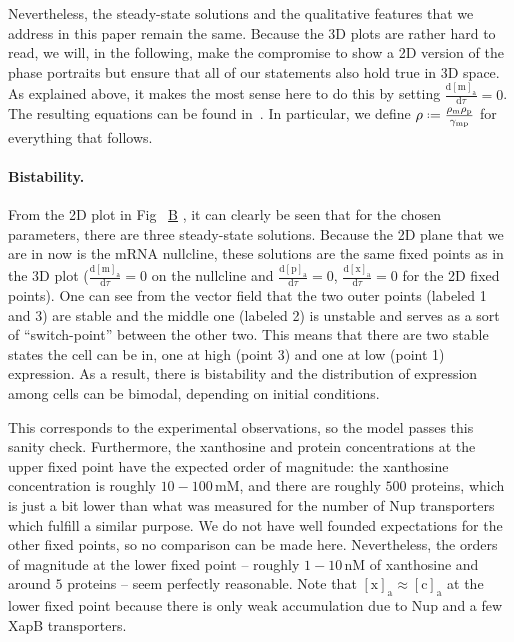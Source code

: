 \documentclass[10pt,letterpaper]{article}
\newcommand{\unit}[1]{\,\mathrm{#1}}
\newcommand{\n}[1]{\mathrm{#1}}
\newcommand{\dd}[2]{\frac{\mathrm{d} #1}{\mathrm{d} #2}}
\newcommand*{\defeq}{\mathrel{\vcenter{\baselineskip0.5ex \lineskiplimit0pt
			\hbox{\scriptsize.}\hbox{\scriptsize.}}}%
	=}
\newcommand\subref[2]{%
	\def\myref{\getrefnumber{#1}}%
	\hyperref[#1]{\myref\mbox{#2}}%
}
\begin{document}
Nevertheless, the steady-state solutions and the qualitative features that
we address in this paper remain the same. Because the 3D plots are rather
hard to read, we will, in the following, make the compromise to show a 2D
version of the phase portraits but ensure that all of our statements also
hold true in 3D space. As explained above, it makes the most sense here to
do this by setting $\dd{\n{[m]_a}}{\tau}=0$. The resulting equations can be
found in~. In particular, we define $\rho \defeq
\frac{\rho_{\n{m}} \rho_{\n{p}}}{\gamma_{\n{mp}}}$ for everything that
follows.

\paragraph*{Bistability.} 
From the 2D plot in Fig~\subref{fig4:bistability}{B}, it can clearly be seen
that for the chosen parameters, there are three steady-state solutions.
Because the 2D plane that we are in now is the mRNA nullcline, these
solutions are the same fixed points as in the 3D plot
($\dd{\n{[m]_a}}{\tau}=0$ on the nullcline and $\dd{\n{[p]_a}}{\tau}=0$,
$\dd{\n{[x]_a}}{\tau}=0$ for the 2D fixed points). One can see from the
vector field that the two outer points (labeled 1 and 3) are stable and the
middle one (labeled 2) is unstable and serves as a sort of ``switch-point''
between the other two. This means that there are two stable states the cell
can be in, one at high (point 3) and one at low (point 1) expression. As a
result, there is bistability and the distribution of expression among cells
can be bimodal, depending on initial conditions.

This corresponds to the experimental observations\cite{Chure2019}, so the model passes this
sanity check. Furthermore, the xanthosine and protein concentrations at the
upper fixed point have the expected order of magnitude: the xanthosine
concentration is roughly $10-100 \unit{mM}$, and there are roughly $500$
proteins, which is just a bit lower than what was measured for the number of
Nup transporters~\cite{Li2014} which fulfill a similar purpose. We do not
have well founded expectations for the other fixed points, so no comparison
can be made here. Nevertheless, the orders of magnitude at the lower fixed
point -- roughly $1-10 \unit{nM}$ of xanthosine and around $5$ proteins --
seem perfectly reasonable. Note that $\n{[x]_a} \approx \n{[c]_a}$ at the
lower fixed point because there is only weak accumulation due to Nup and a
few XapB transporters.
\end{document}
